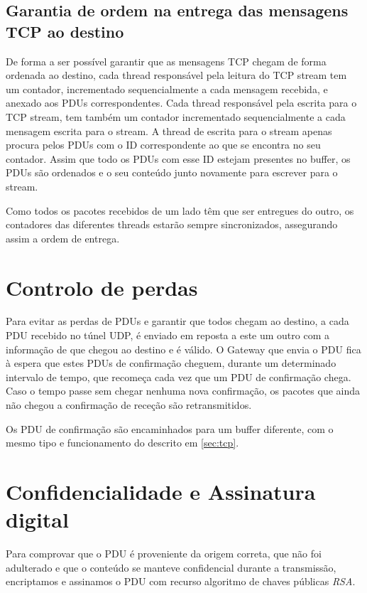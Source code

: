 \documentclass[a4paper]{report}
\begin{document}
\subsection{Garantia de ordem na entrega das mensagens TCP ao destino}

De forma a ser possível garantir que as mensagens TCP chegam de forma ordenada
ao destino, cada thread responsável pela leitura do TCP stream tem um contador,
incrementado sequencialmente a cada mensagem recebida, e anexado aos PDUs
correspondentes. Cada thread responsável pela escrita para o TCP stream, tem
também um contador incrementado sequencialmente a cada mensagem escrita para o
stream. A thread de escrita para o stream apenas procura pelos PDUs com o ID
correspondente ao que se encontra no seu contador. Assim que todo os PDUs com 
esse ID estejam presentes no buffer, os PDUs são ordenados e o seu conteúdo
junto novamente para escrever para o stream.

Como todos os pacotes recebidos de um lado têm que ser entregues do outro,
os contadores das diferentes threads estarão sempre sincronizados, assegurando
assim a ordem de entrega.

\section{Controlo de perdas}

Para evitar as perdas de PDUs e garantir que todos chegam ao destino, a cada 
PDU recebido no túnel UDP, é enviado em reposta a este um outro com a
informação de que chegou ao destino e é válido. O Gateway que envia o PDU
fica à espera que estes PDUs de confirmação cheguem, durante um determinado
intervalo de tempo, que recomeça cada vez que um PDU de confirmação chega.
Caso o tempo passe sem chegar nenhuma nova confirmação, os pacotes que ainda
não chegou a confirmação de receção são retransmitidos.

Os PDU de confirmação são encaminhados para um buffer diferente, com o mesmo
tipo e funcionamento do descrito em \ref{sec:tcp}.

\section{Confidencialidade e Assinatura digital} \label{sec:auth}

Para comprovar que o PDU é proveniente da origem correta, que não foi
adulterado e que o conteúdo se manteve confidencial durante a transmissão,
encriptamos e assinamos o PDU com recurso algoritmo de chaves públicas 
\textit{RSA}. 
\end{document}
